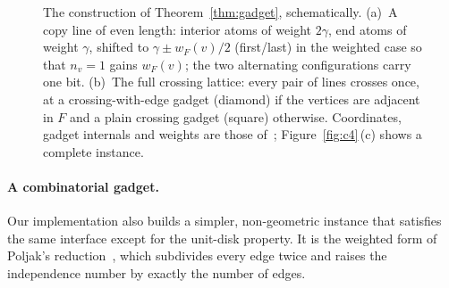 \documentclass[a4paper,fleqn]{cas-sc}
\begin{document}
\begin{figure}[tb]
\caption{The construction of Theorem~\ref{thm:gadget}, schematically. (a)~A copy
line of even length: interior atoms of weight $2\gamma$, end atoms of weight
$\gamma$, shifted to $\gamma\pm w_F(v)/2$ (first/last) in the weighted case so that
$n_v=1$ gains $w_F(v)$; the two alternating configurations carry one bit. (b)~The full crossing lattice: every pair of lines crosses
once, at a crossing-with-edge gadget (diamond) if the vertices are adjacent in $F$
and a plain crossing gadget (square) otherwise. Coordinates, gadget internals and
weights are those of~\citet{Nguyen2023}; Figure~\ref{fig:c4}\,(c) shows a complete
instance.}
\label{fig:gadgets}
\end{figure}

\paragraph{A combinatorial gadget.} Our implementation also builds a simpler,
non-geometric instance that satisfies the same interface except for the unit-disk
property. It is the weighted form of Poljak's reduction~\cite{Poljak1974}, which
subdivides every edge twice and raises the independence number by exactly the number
of edges.
\end{document}
